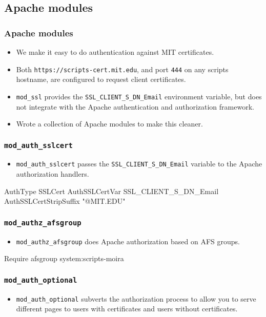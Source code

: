 \subsection{Apache modules}

\begin{frame}[fragile]
  \frametitle{Apache modules}
  \begin{itemize}
  \item We make it easy to do authentication against MIT certificates.
  \item Both \texttt{https://scripts-cert.mit.edu}, and port
    \texttt{444} on any scripts hostname, are configured to request
    client certificates.
  \item \texttt{mod\_ssl} provides the
    \texttt{SSL\_CLIENT\_S\_DN\_Email} environment variable, but does
    not integrate with the Apache authentication and authorization
    framework.
  \item Wrote a collection of Apache modules to make this cleaner.
  \end{itemize}
\end{frame}

\begin{frame}[fragile]
  \frametitle{\texttt{mod\_auth\_sslcert}}
  \begin{itemize}
  \item \texttt{mod\_auth\_sslcert} passes the
    \texttt{SSL\_CLIENT\_S\_DN\_Email} variable to the Apache
    authorization handlers.
  \end{itemize}
\begin{semiverbatim}
AuthType SSLCert
AuthSSLCertVar SSL_CLIENT_S_DN_Email
AuthSSLCertStripSuffix "@MIT.EDU"
\end{semiverbatim}
\end{frame}

\begin{frame}[fragile]
  \frametitle{\texttt{mod\_authz\_afsgroup}}
  \begin{itemize}
  \item \texttt{mod\_authz\_afsgroup} does Apache authorization based
    on AFS groups.
  \end{itemize}
\begin{semiverbatim}
Require afsgroup system:scripts-moira
\end{semiverbatim}
\end{frame}

\begin{frame}[fragile]
  \frametitle{\texttt{mod\_auth\_optional}}
  \begin{itemize}
  \item \texttt{mod\_auth\_optional} subverts the authorization
    process to allow you to serve different pages to users with
    certificates and users without certificates.
  \end{itemize}
\end{frame}
